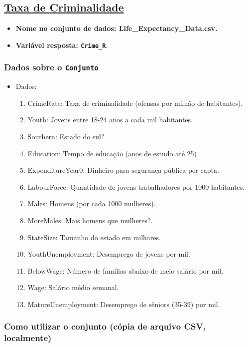 \documentclass[11pt]{article}
\begin{document}
\subsection{\href{https://www.sheffield.ac.uk/mash/statistics/datasets}{Taxa de Criminalidade}}
\label{sec:orgbc14e62}
\begin{itemize}
\item \textbf{Nome no conjunto de dados: \textbf{Life_Expectancy_Data.csv}.}
\item \textbf{Variável resposta: \texttt{Crime_R}}.
\end{itemize}
\subsubsection{Dados sobre o \texttt{Conjunto}}
\label{sec:org19b73ae}
\begin{itemize}
\item Dados:
\begin{enumerate}
\item CrimeRate: Taxa de criminalidade (ofensas por milhão de habitantes).
\item Youth: Jovens entre 18-24 anos a cada mil habitantes.
\item Southern: Estado do sul?
\item Education: Tempo de educação (anos de estudo até 25)
\item ExpenditureYear0: Dinheiro para segurança pública per capta.
\item LabourForce: Quantidade de jovens trabalhadores por 1000 habitantes.
\item Males: Homens (por cada 1000 mulheres).
\item MoreMales: Mais homens que mulheres?.
\item StateSize: Tamanho do estado em milhares.
\item YouthUnemployment: Desemprego de jovens por mil.
\item BelowWage: Número de famílias abaixo de meio salário por mil.
\item Wage: Salário médio semanal.
\item MatureUnemployment: Desemprego de sêniors (35-39) por mil.
\end{enumerate}
\end{itemize}

\subsubsection{Como utilizar o conjunto (cópia de arquivo CSV, localmente)}
\label{sec:org6940c44}
\end{document}
